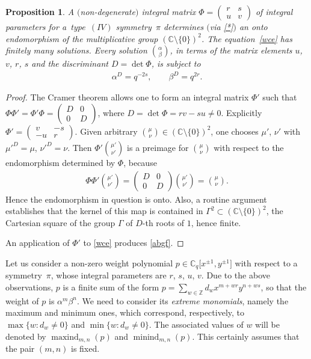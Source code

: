 \documentclass[pdftex]{sigma}
\numberwithin{equation}{section}
\newtheorem{Proposition}[Theorem]{Proposition}
 { \theoremstyle{definition}
\newtheorem{Definition}[Theorem]{Definition}
\newtheorem{Remark}[Theorem]{Remark} }
\begin{document}
\begin{Proposition}A $($non-degenerate$)$ integral matrix $\Phi=\left(\begin{smallmatrix}r & s\\ u & v\end{smallmatrix}\right)$ of integral parameters for a~type~$(IV)$ symmetry~$\pi$ determines $($via \eqref{*}$)$ an onto endomorphism of the multiplicative group $(\mathbb{C}{\setminus}\{0\})^2$. The equation~\eqref{wce} has finitely many solutions. Every solution $\binom{\alpha}{\beta}$, in terms of the matrix elements $u$, $v$, $r$, $s$ and the discriminant $D=\det\Phi$, is subject to
\begin{gather}\label{abgf}
\alpha^D=q^{-2s},\qquad\beta^D=q^{2r}.
\end{gather}
\end{Proposition}

\begin{proof} The Cramer theorem allows one to form an integral matrix $\Phi'$ such that $\Phi\Phi'=\Phi'\Phi=\left(\begin{smallmatrix}D & 0\\ 0 & D\end{smallmatrix}\right)$, where $D=\det\Phi=rv-su\ne 0$. Explicitly $\Phi'=\left(\begin{smallmatrix}v & -s\\ -u & r\end{smallmatrix}\right)$. Given arbitrary $\binom{\mu}{\nu}\in(\mathbb{C}{\setminus}\{0\})^2$, one chooses $\mu'$, $\nu'$ with $\mu'^D=\mu$, $\nu'^D=\nu$. Then $\Phi'\binom{\mu'}{\nu'}$ is a preimage for $\binom{\mu}{\nu}$ with respect to the endomorphism determined by $\Phi$, because
\begin{gather*}
\Phi\Phi'\binom{\mu'}{\nu'}=\begin{pmatrix}D & 0\\ 0 & D\end{pmatrix}\binom{\mu'}{\nu'}=\binom{\mu}{\nu}.
\end{gather*}
Hence the endomorphism in question is onto. Also, a routine argument establishes that the kernel of this map is contained in $\Gamma^2\subset(\mathbb{C}{\setminus}\{0\})^2$, the Cartesian square of the group $\Gamma$ of $D$-th roots of $1$, hence finite.

An application of $\Phi'$ to \eqref{wce} produces \eqref{abgf}.
\end{proof}


Let us consider a non-zero weight polynomial $p\in\mathbb{C}_q\big[x^{\pm 1},y^{\pm 1}\big]$ with respect to a symmet\-ry~$\pi$, whose integral parameters are $r$, $s$, $u$, $v$. Due to the above observations, $p$ is a finite sum of the form $p=\sum\limits_{w\in\mathbb{Z}}d_wx^{m+wr}y^{n+ws}$, so that the weight of $p$ is $\alpha^m\beta^n$. We need to consider its {\it extreme monomials}, namely the maximum and minimum ones, which correspond, respectively, to $\max\{w\colon d_w\ne 0\}$ and $\min\{w\colon d_w\ne 0\}$. The associated values of $w$ will be denoted by $\operatorname{maxind}_{m,n}(p)$ and $\operatorname{minind}_{m,n}(p)$. This certainly assumes that the pair $(m,n)$ is fixed.
\end{document}
